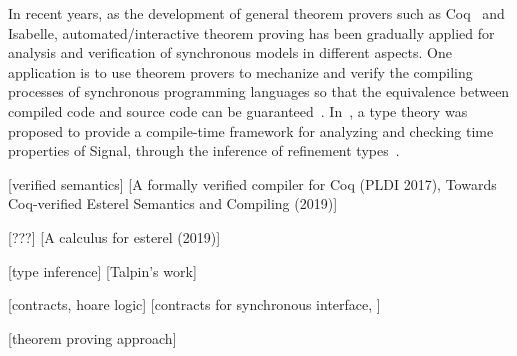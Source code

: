 \documentclass{fcs}
\begin{document}
In recent years, as the development of general theorem provers such as Coq~\cite{Coq} and Isabelle, automated/interactive theorem proving has been gradually applied for analysis and verification of synchronous models in different aspects.
One application is to use theorem provers to mechanize and verify the compiling processes of synchronous programming languages so that
the equivalence between compiled code and source code can be guaranteed~\cite{A formally verified compiler for Coq (PLDI 2017),Towards Coq-verified Esterel Semantics and Compiling (2019)}.
In~\cite{talpin's refinement type for dataflow models}, a type theory was proposed to provide a compile-time framework for analyzing and checking time properties of Signal, through the inference of refinement types~\cite{Liquid Type}.


[verified semantics]
[A formally verified compiler for Coq (PLDI 2017), Towards Coq-verified Esterel Semantics and Compiling (2019)]

[???]
[A calculus for esterel (2019)]

[type inference]
[Talpin's work]

[contracts, hoare logic]
[contracts for synchronous interface, ]


[theorem proving approach]
\fi
\end{document}

